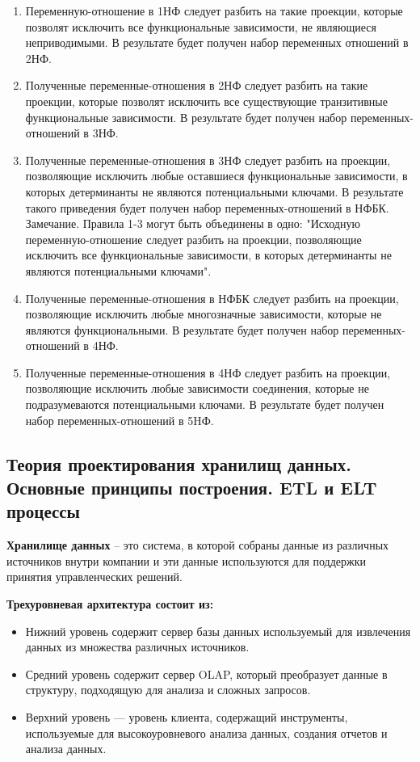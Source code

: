 \begin{enumerate}
	\item Переменную-отношение в 1НФ следует разбить на такие проекции, которые позволят исключить все функциональные зависимости, не являющиеся неприводимыми. В результате будет получен набор переменных отношений в 2НФ.
	\item Полученные переменные-отношения в 2НФ следует разбить на такие проекции, которые позволят исключить все существующие транзитивные функциональные зависимости. В результате будет получен набор переменных-отношений в 3НФ.
	\item Полученные переменные-отношения в 3НФ следует разбить на проекции, позволяющие исключить любые
	оставшиеся функциональные зависимости, в которых детерминанты не являются потенциальными ключами. В результате такого приведения будет получен набор переменных-отношений в НФБК. 
	Замечание.
	Правила 1-3 могут быть объединены в одно: "Исходную переменную-отношение следует разбить на проекции, позволяющие исключить все функциональные зависимости, в которых детерминанты не являются
	потенциальными ключами".
	\item Полученные переменные-отношения в НФБК следует разбить на проекции, позволяющие исключить любые многозначные зависимости, которые не являются функциональными. В результате будет получен
	набор переменных- отношений в 4НФ.
	\item Полученные переменные-отношения в 4НФ следует разбить на проекции, позволяющие исключить любые зависимости соединения, которые не подразумеваются потенциальными ключами. В результате будет
	получен набор переменных-отношений в 5HФ.
\end{enumerate} 


\subsection{Теория проектирования хранилищ данных. Основные принципы построения. ETL и ELT процессы}

\textbf{Хранилище данных} – это система, в которой собраны данные из различных источников внутри компании и эти данные используются для поддержки принятия управленческих решений.

\textbf{Трехуровневая архитектура состоит из:}

\begin{itemize}
	\item Нижний уровень содержит сервер базы данных используемый для извлечения данных из множества различных источников.
	\item Средний уровень содержит сервер OLAP, который преобразует данные в структуру, подходящую для анализа и сложных запросов. 
	\item Верхний уровень --- уровень клиента, содержащий инструменты, используемые для высокоуровневого анализа данных, создания отчетов и анализа данных. 
\end{itemize}

